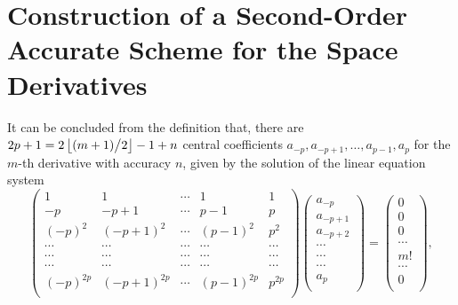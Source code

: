\documentclass{assignment}[2019/10/15]
\newcommand{\lr}[3]{\left#1#3\right#2}
\begin{document}

    \section{Construction of a Second-Order Accurate Scheme for the Space Derivatives}

    It can be concluded from the definition that, there are $2p+1 = 2\lr\lfloor\rfloor{(m+1)\middle /2}-1+n$ central coefficients $a_{-p}, a_{-p+1}, \dotsc, a_{p-1}, a_p$ for the $m$-th derivative with accuracy $n$, given by the solution of the linear equation system
    \begin{equation}
        \begin{pmatrix}
            1 & 1 & \cdots & 1 & 1\\
            -p & -p+1 & \cdots & p-1 & p\\
            (-p)^2 & (-p+1)^2 & \cdots & (p-1)^2 & p^2\\
            \cdots & \cdots & \cdots & \cdots & \cdots\\
            \cdots & \cdots & \cdots & \cdots & \cdots\\
            \cdots & \cdots & \cdots & \cdots & \cdots\\
            (-p)^{2p} & (-p+1)^{2p} & \cdots & (p-1)^{2p} & p^{2p}\\
        \end{pmatrix}
        \begin{pmatrix}
            a_{-p}\\
            a_{-p+1}\\
            a_{-p+2}\\
            \cdots\\
            \cdots\\
            \cdots\\
            a_p\\
        \end{pmatrix}
        =
        \begin{pmatrix}
            0\\
            0\\
            0\\
            \cdots\\
            m!\\
            \cdots\\
            0\\
        \end{pmatrix},
    \end{equation}
\end{document}
